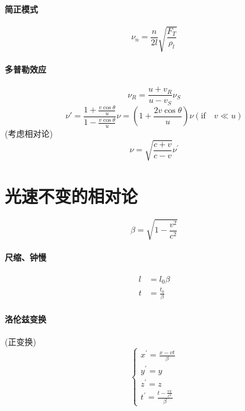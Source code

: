 \documentclass[12pt,a4paper]{article}
\numberwithin{equation}{section}
\begin{document}
\begin{CJK}{UTF8}{gbsn}
\paragraph{简正模式}
\begin{equation}
  \nu_n=\frac{n}{2l}\sqrt{\frac{F_T}{\rho_l}}
\end{equation}

\paragraph{多普勒效应}
\begin{equation}
  \nu_R=\frac{u+v_R}{u-v_S}\nu_S
\end{equation}
\begin{equation}
  \nu'=\frac{1+\frac{v\cos\theta}{u}}{1-\frac{v\cos\theta}{u}}\nu =\left(1+\frac{2v\cos \theta}{u}\right)\nu (\textrm{if} \quad v\ll u)
\end{equation}
(考虑相对论)
\begin{equation}
  \nu=\sqrt{\frac{c+v}{c-v}} \nu^{\prime}
\end{equation}

\section{光速不变的相对论}
\begin{equation}
  \beta=\sqrt{1-\frac{v^2}{c^2}}
\end{equation}
\paragraph{尺缩、钟慢}
\begin{align}
  l &= l_0 \beta \\
  t &= \frac{t_0}{\beta}
\end{align}

\paragraph{洛伦兹变换\\}
(正变换)
\begin{equation}
\left\{
  \begin{array}{ll}
    x^{\prime}=\frac{x-vt}{\beta} \\
    y^{\prime}=y \\
    z^{\prime}=z \\
    t^{\prime}=\frac{t-\frac{vx}{c^2}}{\beta}
  \end{array}
\right.
\end{equation}


\end{CJK}
\end{document}
